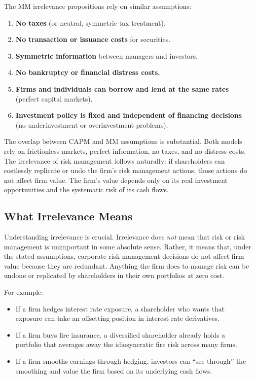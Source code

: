 \documentclass[11pt,openany]{book}
\providecommand{\tightlist}{\setlength{\itemsep}{0pt}\setlength{\parskip}{0pt}}
\begin{document}
The MM irrelevance propositions rely on similar assumptions:

\begin{enumerate}
\def\labelenumi{\arabic{enumi}.}
\tightlist
\item
  \textbf{No taxes} (or neutral, symmetric tax treatment).
\item
  \textbf{No transaction or issuance costs} for securities.
\item
  \textbf{Symmetric information} between managers and investors.
\item
  \textbf{No bankruptcy or financial distress costs.}
\item
  \textbf{Firms and individuals can borrow and lend at the same rates} (perfect capital markets).
\item
  \textbf{Investment policy is fixed and independent of financing decisions} (no underinvestment or overinvestment problems).
\end{enumerate}

The overlap between CAPM and MM assumptions is substantial. Both models rely on frictionless markets, perfect information, no taxes, and no distress costs. The irrelevance of risk management follows naturally: if shareholders can costlessly replicate or undo the firm's risk management actions, those actions do not affect firm value. The firm's value depends only on its real investment opportunities and the systematic risk of its cash flows.

\subsection{What Irrelevance Means}\label{what-irrelevance-means}

Understanding irrelevance is crucial. Irrelevance does \emph{not} mean that risk or risk management is unimportant in some absolute sense. Rather, it means that, under the stated assumptions, corporate risk management decisions do not affect firm value because they are redundant. Anything the firm does to manage risk can be undone or replicated by shareholders in their own portfolios at zero cost.

For example:

\begin{itemize}
\tightlist
\item
  If a firm hedges interest rate exposure, a shareholder who wants that exposure can take an offsetting position in interest rate derivatives.
\item
  If a firm buys fire insurance, a diversified shareholder already holds a portfolio that averages away the idiosyncratic fire risk across many firms.
\item
  If a firm smooths earnings through hedging, investors can ``see through'' the smoothing and value the firm based on its underlying cash flows.
\end{itemize}
\end{document}
